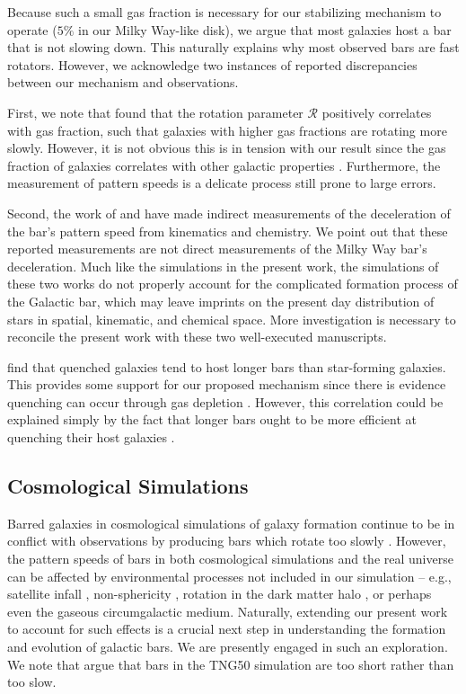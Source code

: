 \documentclass[twocolumn,linenumbers]{aastex631}
\newcommand{\Rot}{\ensuremath{\mathcal{R}}}
\begin{document}
Because such a small gas fraction is necessary for our stabilizing mechanism to
operate ($5\%$ in our Milky Way-like disk), we argue that most galaxies host a
bar that is not slowing down. This naturally explains why most observed bars are
fast rotators. However, we acknowledge two instances of reported discrepancies
between our mechanism and observations.

First, we note that \citet{2020MNRAS.491.3655G} found that the rotation
parameter \Rot{} positively correlates with gas fraction, such that galaxies
with higher gas fractions are rotating more slowly. However, it is not obvious
this is in tension with our result since the gas fraction of galaxies correlates
with other galactic properties \citep{2009ARAA..47..159B}. Furthermore, the
measurement of pattern speeds is a delicate process still prone to large errors.

Second, the work of \citet{2021MNRAS.500.4710C} and \citet{2021MNRAS.505.2412C}
have made indirect measurements of the deceleration of the bar's pattern speed
from kinematics and chemistry. We point out that these reported measurements are
not direct measurements of the Milky Way bar's deceleration. Much like the
simulations in the present work, the simulations of these two works do not
properly account for the complicated formation process of the Galactic bar,
which may leave imprints on the present day distribution of stars in spatial,
kinematic, and chemical space. More investigation is necessary to reconcile the
present work with these two well-executed manuscripts.

\citet{2020MNRAS.495.4158F} find that quenched galaxies tend to host longer bars
than star-forming galaxies. This provides some support for our proposed
mechanism since there is evidence quenching can occur through gas depletion
\citep[e.g.][]{2021Natur.597..485W}. However, this correlation could be
explained simply by the fact that longer bars ought to be more efficient at
quenching their host galaxies \citep[e.g][]{2015AA...580A.116G}.

\subsection{Cosmological Simulations}
Barred galaxies in cosmological simulations of galaxy formation continue to be
in conflict with observations by producing bars which rotate too slowly
\citep{2017MNRAS.469.1054A, 2019MNRAS.483.2721P, 2021AA...650L..16F,
2022ApJ...940...61F}. However, the pattern speeds of bars in both cosmological
simulations and the real universe can be affected by environmental processes not
included in our simulation -- e.g., satellite infall
\citep{2011Natur.477..301P}, non-sphericity \citep{2013MNRAS.429.1949A},
rotation in the dark matter halo \citep{2013MNRAS.434.1287S,
2014ApJ...783L..18L, 2018MNRAS.476.1331C, 2019MNRAS.488.5788C}, or perhaps even
the gaseous circumgalactic medium. Naturally, extending our present work to
account for such effects is a crucial next step in understanding the formation
and evolution of galactic bars. We are presently engaged in such an exploration.
We note that \citet{2022ApJ...940...61F} argue that bars in the TNG50 simulation
are too short rather than too slow.
\end{document}
